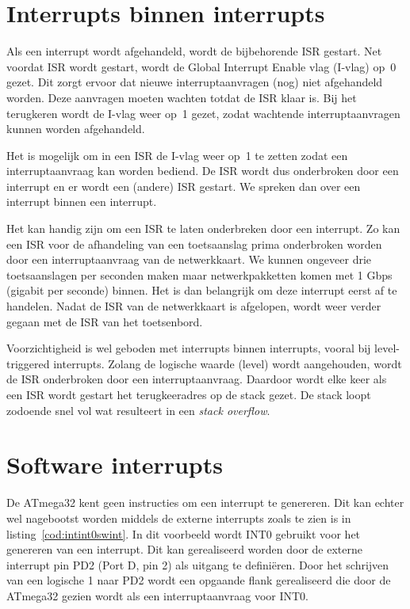\section{Interrupts binnen interrupts}
Als een interrupt wordt afgehandeld, wordt de bijbehorende ISR gestart. Net
voordat ISR wordt gestart, wordt de Global Interrupt Enable vlag (I-vlag)
op~0 gezet. Dit zorgt ervoor dat nieuwe interruptaanvragen (nog) niet
afgehandeld worden. Deze aanvragen moeten wachten totdat de ISR klaar is.
Bij het terugkeren wordt de I-vlag weer op~1 gezet, zodat wachtende
interruptaanvragen kunnen worden afgehandeld.

Het is mogelijk om in een ISR de I-vlag weer op~1 te zetten zodat een
interruptaanvraag kan worden bediend. De ISR wordt dus onderbroken door
een interrupt en er wordt een (andere) ISR gestart. We spreken dan over
een interrupt binnen een interrupt.

Het kan handig zijn om een ISR te laten onderbreken door een interrupt.
Zo kan een ISR voor de afhandeling van een toetsaanslag prima onderbroken
worden door een interruptaanvraag van de netwerkkaart. We kunnen ongeveer
drie toetsaanslagen per seconden maken maar netwerkpakketten komen met
1 Gbps (gigabit per seconde) binnen. Het is dan belangrijk om deze
interrupt eerst af te handelen. Nadat de ISR van de netwerkkaart is
afgelopen, wordt weer verder gegaan met de ISR van het toetsenbord.

Voorzichtigheid is wel geboden met interrupts binnen interrupts, vooral
bij level-triggered interrupts. Zolang de logische waarde (level) wordt
aangehouden, wordt de ISR onderbroken door een interruptaanvraag. Daardoor
wordt elke keer als een ISR wordt gestart het terugkeeradres op de stack
gezet. De stack loopt zodoende snel vol wat resulteert in een \textsl{stack
overflow}.

\section{Software interrupts}
De ATmega32 kent geen instructies om een interrupt te genereren. Dit kan
echter wel nagebootst worden middels de externe interrupts zoals te zien
is in listing~\ref{cod:intint0swint}. In dit voorbeeld wordt INT0 gebruikt
voor het genereren van een interrupt. Dit kan gerealiseerd worden door
de externe interrupt pin PD2 (Port D, pin 2) als uitgang te defini\"eren.
Door het schrijven van een logische 1 naar PD2 wordt een opgaande flank
gerealiseerd die door de ATmega32 gezien wordt als een interruptaanvraag
voor INT0.

